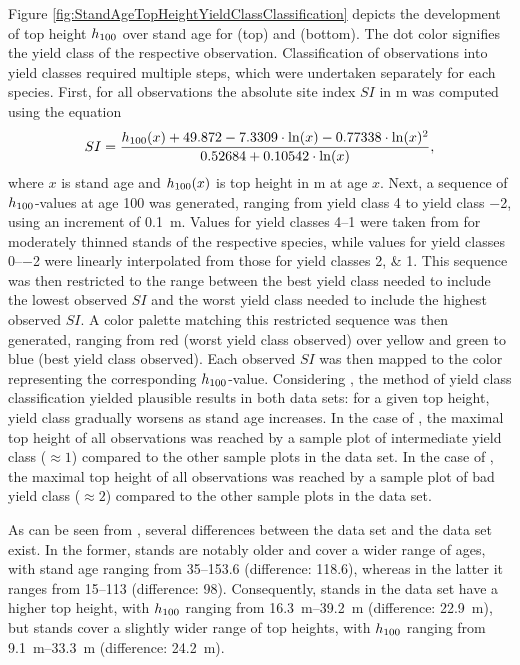 Figure \ref{fig:StandAgeTopHeightYieldClassClassification} depicts the development of top height \(h_{100}\) over stand age for \Beech{} (top) and \Spruce{} (bottom).  The dot color signifies the yield class of the respective observation.  Classification of observations into yield classes required multiple steps, which were undertaken separately for each species.  First, for all observations the absolute site index \(SI\) in \si{\meter} was computed using the equation
\begin{equation}
  \label{eq:NagelFunctionSolvedForSI}
  SI = \frac{h_{100}(x) + 49.872 - 7.3309 \cdot \ln(x) - 0.77338 \cdot \ln(x)^2 }{0.52684 + 0.10542 \cdot \ln(x)} ,
\end{equation}
\parencite{Nagel1999} where \(x\) is stand age and \(h_{100}(x)\) is top height in \si{\meter} at age \(x\).  Next, a sequence of \(h_{100}{}\)-values at age \SI{100}{\year} was generated, ranging from yield class \num{4} to yield class \num{-2}, using an increment of \SI{0.1}{\meter}.  Values for yield classes \numrange{4}{1} were taken from \textcite{Schober1995} for moderately thinned stands of the respective species, while values for yield classes \numrange{0}{-2} were linearly interpolated from those for yield classes \numlist{2; 1}.   This sequence was then restricted to the range between the best yield class needed to include the lowest observed \(SI\) and the worst yield class needed to include the highest observed \(SI\).  A color palette matching this restricted sequence was then generated, ranging from red (worst yield class observed) over yellow and green to blue (best yield class observed).  Each observed \(SI\) was then mapped to the color representing the corresponding \(h_{100}{}\)-value.  Considering , the method of yield class classification yielded plausible results in both data sets:  for a given top height, yield class gradually worsens as stand age increases.   In the case of \Beech{}, the maximal top height of all observations was reached by a sample plot of intermediate yield class (\(\approx{} 1\)) compared to the other sample plots in the data set.   In the case of \Spruce{}, the maximal top height of all observations was reached by a sample plot of bad yield class (\(\approx{} 2\)) compared to the other sample plots in the data set.  

As can be seen from , several differences between the \Beech{} data set and the \Spruce{} data set exist.
In the former, stands are notably older and cover a wider range of ages, with stand age ranging from \SIrange{35}{153.6}{\year} (difference: \SI{118.6}{\year}), whereas in the latter it ranges from \SIrange{15}{113}{\year} (difference: \SI{98}{\year}).  Consequently, stands in the \Beech{} data set have a higher top height, with \(h_{100}\) ranging from \SIrange{16.3}{39.2}{\meter} (difference: \SI{22.9}{\meter}), but \Spruce{} stands cover a slightly wider range of top heights, with \(h_{100}{}\) ranging from \SIrange{9.1}{33.3}{\meter} (difference: \SI{24.2}{\meter}).

